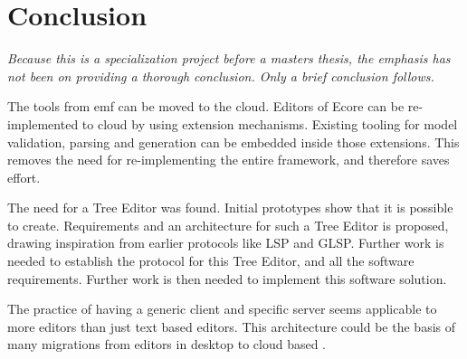 \chapter{Conclusion}


\emph{Because this is a specialization project before a masters thesis, the emphasis has not been on providing a thorough conclusion. Only a brief conclusion follows.}

\par
The tools from \gls{emf} can be moved to the \gls{cloud}.
Editors of \gls{Ecore} can be re-implemented to \gls{cloud}  by using extension mechanisms.
Existing tooling for model validation, parsing and generation can be embedded inside those extensions.
This removes the need for re-implementing the entire framework, and therefore saves effort.

\par
The need for a Tree Editor was found.
Initial prototypes show that it is possible to create.
Requirements and an architecture for such a Tree Editor is proposed, drawing inspiration from earlier protocols like \gls{LSP} and \gls{GLSP}.
Further work is needed to establish the protocol for this Tree Editor, and all the software requirements.
Further work is then needed to implement this software solution.

\par
The practice of having a generic client and specific server seems applicable to more editors than just text based editors.
This architecture could be the basis of many migrations from editors in desktop  to \gls{cloud} based .